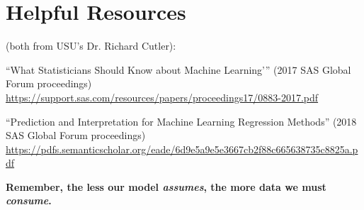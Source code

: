 \documentclass[12pt]{notes}
\begin{document}
\section{Helpful Resources}
(both from USU’s Dr. Richard Cutler):
\bi
\item “What Statisticians Should Know about Machine Learning'” (2017 SAS Global Forum proceedings)
\url{https://support.sas.com/resources/papers/proceedings17/0883-2017.pdf}
\item “Prediction and Interpretation for Machine Learning Regression Methods” (2018 SAS Global Forum proceedings)
\url{https://pdfs.semanticscholar.org/eade/6d9e5a9e5e3667cb2f88c665638735c8825a.pdf}
\ei





\nspace
\textbf{Remember, the less our model \textit{assumes}, the more data we must \textit{consume}.}

\end{document}
